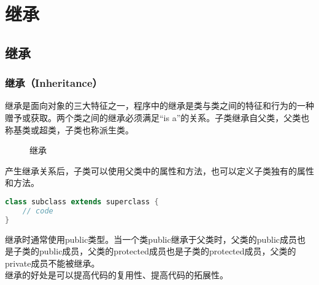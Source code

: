 \chapter{继承}

\section{继承}

\subsection{继承（Inheritance）}

继承是面向对象的三大特征之一，程序中的继承是类与类之间的特征和行为的一种赠予或获取。两个类之间的继承必须满足“is a”的关系。子类继承自父类，父类也称基类或超类，子类也称派生类。

\begin{figure}[H]
	\centering
	\caption{继承}
\end{figure}

产生继承关系后，子类可以使用父类中的属性和方法，也可以定义子类独有的属性和方法。

\vspace{-0.5cm}

\begin{lstlisting}[language=Java]
class subclass extends superclass {
    // code
}
\end{lstlisting}

继承时通常使用public类型。当一个类public继承于父类时，父类的public成员也是子类的public成员，父类的protected成员也是子类的protected成员，父类的private成员不能被继承。\\

继承的好处是可以提高代码的复用性、提高代码的拓展性。\\

